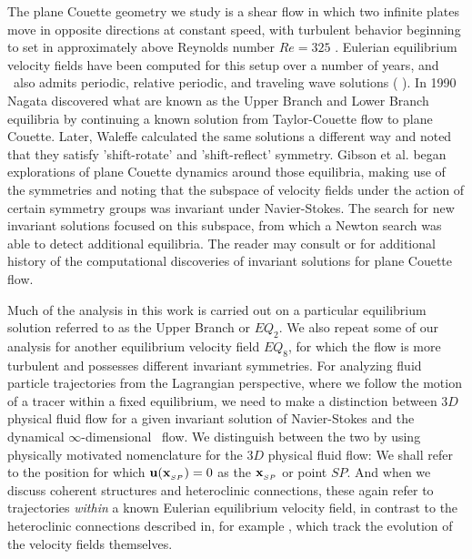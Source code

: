 \documentclass[letter,12pt,openany]{article}
\begin{document}
The plane Couette geometry we study is a shear flow in which two infinite plates move in opposite directions at constant speed, with turbulent behavior beginning to set in approximately above Reynolds number $Re=325$ \cite{HGCV09}. 
Eulerian equilibrium velocity fields have been computed for this setup over a number of years, and \pCf\ also admits periodic, relative periodic, and traveling wave solutions (\cite{HGCV09} \cite{DV04}). In 1990 Nagata \cite{N90} discovered what are known as the Upper Branch and Lower Branch equilibria by continuing a known solution from Taylor-Couette flow to plane
Couette. Later, Waleffe \cite{W03}
calculated the same solutions a different way and noted that they
satisfy 'shift-rotate' and 'shift-reflect' symmetry. Gibson et al. \cite{GHCW07} began explorations of plane Couette dynamics around
those equilibria, making use of the symmetries and noting that the subspace of velocity fields under the action of certain symmetry groups was invariant under Navier-Stokes.
The search for new invariant solutions focused on this subspace, from which a Newton search was able to detect additional equilibria. The reader may consult \cite{HGCV09} or \cite{GHCW07} for additional history of the computational discoveries of invariant solutions for plane Couette flow.

Much of the analysis in this work is carried out on a particular equilibrium solution referred to as the Upper Branch or $EQ_2$.
    We also repeat some of our analysis  for another equilibrium velocity field $EQ_8$, for which the flow is more turbulent
    and possesses different invariant symmetries.
For analyzing fluid particle trajectories from the Lagrangian perspective, where we follow the motion of a tracer within a fixed equilibrium,  we need to make a distinction between
$3D$ physical fluid flow for a given invariant solution of Navier-Stokes
and the dynamical $\infty$-dimensional \statesp\ flow. We distinguish between the two by using physically motivated nomenclature
for the $3D$ physical fluid flow: We shall refer to the position
 for which
${\bf u}({\bf x}_{_{SP}})=0$
as the {\em \stagp} ${\bf x}_{_{SP}}$ or point $SP$. And when we discuss coherent structures and heteroclinic connections, these again refer to trajectories \textit{within} a known Eulerian equilibrium velocity field, in contrast to the heteroclinic connections described in, for example \cite{HGCV09}, which track the evolution of the velocity fields themselves.
\end{document}
